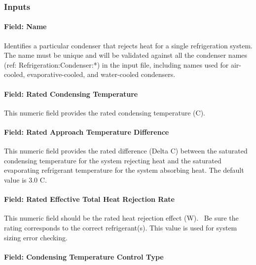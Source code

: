 \subsubsection{Inputs}\label{inputs-11-014}

\paragraph{Field: Name}\label{field-name-12-009}

Identifies a particular condenser that rejects heat for a single refrigeration system. The name must be unique and will be validated against all the condenser names (ref: Refrigeration:Condenser:*) in the input file, including names used for air-cooled, evaporative-cooled, and water-cooled condensers.

\paragraph{Field: Rated Condensing Temperature}\label{field-rated-condensing-temperature-1}

This numeric field provides the rated condensing temperature (C).

\paragraph{Field: Rated Approach Temperature Difference}\label{field-rated-approach-temperature-difference}

This numeric field provides the rated difference (Delta C) between the saturated condensing temperature for the system rejecting heat and the saturated evaporating refrigerant temperature for the system absorbing heat. The default value is 3.0 C.

\paragraph{Field: Rated Effective Total Heat Rejection Rate}\label{field-rated-effective-total-heat-rejection-rate-2}

This numeric field should be the rated heat rejection effect (W).~ Be sure the rating corresponds to the correct refrigerant(s). This value is used for system sizing error checking.

\paragraph{Field: Condensing Temperature Control Type}\label{field-condensing-temperature-control-type}

